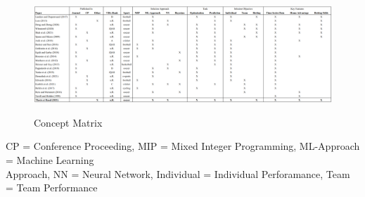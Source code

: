 \clearpage\pagestyle{empty} %
\begin{landscape} %
\begin{figure}[h]
    \caption{Concept Matrix}
    \centering
    \includegraphics[width=25cm]{chapter/literature_review/section/matrix.png}
    \label{tab:concept_matrix}
\end{figure}
\footnotesize \noindent CP = Conference Proceeding, MIP = Mixed Integer Programming, ML-Approach = Machine Learning \\
Approach, NN = Neural Network, Individual = Individual Perforamance, Team = Team Performance 

\restoregeometry %

\end{landscape}
\pagestyle{scrheadings} %